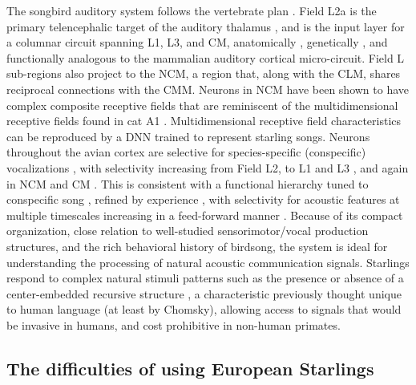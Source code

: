 The songbird auditory system follows the vertebrate plan \cite{Carr1992}. Field L2a is the primary telencephalic target of the auditory thalamus \cite{Karten1968}, and is the input layer for a columnar circuit spanning L1, L3, and \ac{CM}, anatomically \cite{Wang2010a,Jarvis2005}, genetically \cite{Dugas-Ford2012}, and functionally \cite{Calabrese2015} analogous to the mammalian auditory cortical micro-circuit. Field L sub-regions also project to the \ac{NCM}, a region that, along with the \ac{CLM}, shares reciprocal connections with the \ac{CMM}. Neurons in \ac{NCM} have been shown to have complex composite receptive fields \cite{kozlov2016central} that are reminiscent of the multidimensional receptive fields found in cat A1 \cite{atencio2008cooperative}. Multidimensional receptive field characteristics can be reproduced by a \ac{DNN} \cite{kozlov2016central} trained to represent starling songs. Neurons throughout the avian cortex are selective for species-specific (conspecific) vocalizations \cite{Bonke1979,Leppelsack1976,Muller1985}, with selectivity increasing from Field L2, to L1 and L3 \cite{Theunissen2004,Theunissen1998,Theunissen2000}, and again in \ac{NCM} and \ac{CM} \cite{Calabrese2015,Muller1985,Grace2003,Bonke1979,Leppelsack1976,gentner2003neuronal,Gentner2004,Thompson2010,Jeanne2011}. This is consistent with a functional hierarchy tuned to conspecific song \cite{Hsu2004,Woolley2005}, refined by experience \cite{gentner2003neuronal,Sockman2002,Sockman2005,Phan2006,Thompson2010,Jeanne2011}, with selectivity for acoustic features at multiple timescales increasing in a feed-forward manner \cite{Rose1988,Kaas2000,Binder2000,VanEssen1992}. Because of its compact organization, close relation to well-studied sensorimotor/vocal production structures, and the rich behavioral history of birdsong, the system is ideal for understanding the processing of natural acoustic communication signals.
Starlings respond to complex natural stimuli patterns such as the presence or absence of a center-embedded recursive structure \cite{gentner2006recursive,comins2014auditory,comins2014temporal}, a characteristic previously thought unique to human language (at least by Chomsky), allowing access to signals that would be invasive in humans, and cost prohibitive in non-human primates.

\subsection{The difficulties of using European Starlings}

